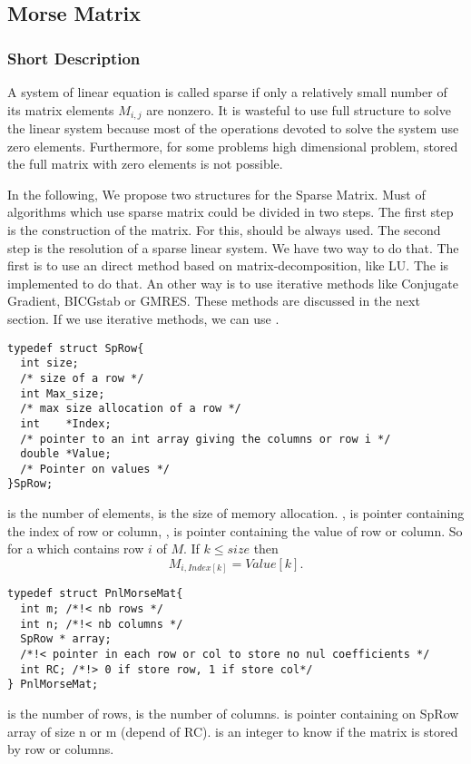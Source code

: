 \subsection{Morse Matrix}
\subsubsection{Short Description}

A system of linear equation is called sparse if only a relatively small number
of its matrix elements $M_{i, j}$ are nonzero. It is wasteful to use full
structure to solve the linear system because most of the operations
devoted to solve the system use zero elements. Furthermore, for some problems
high dimensional problem, stored the full matrix with zero elements is not
possible.


In the following, We propose two structures for the Sparse Matrix.
Must of algorithms which use sparse matrix could be divided in two steps.
The first step is the construction of the matrix. For this, 
 should be always used. The second step is the
resolution of a sparse linear system. We have two way to do that. The first is
to use an direct method based on matrix-decomposition, like LU. The
 is implemented to do that. An other way is to use
iterative methods like Conjugate Gradient, BICGstab or GMRES. These methods are
discussed in the next section. If we use iterative methods, we can use 
. 

\begin{verbatim}
typedef struct SpRow{
  int size;
  /* size of a row */
  int Max_size;
  /* max size allocation of a row */
  int    *Index;
  /* pointer to an int array giving the columns or row i */
  double *Value;
  /* Pointer on values */
}SpRow;
\end{verbatim}
 is the number of elements, 
 is the size of memory allocation.
, is pointer containing the index of row or column, 
, is pointer containing the value of row or column.
So for a  which contains row $i$ of $M$.
If $k \leq size $ then
$$M_{i, Index[k]}=Value[k].$$  

\begin{verbatim}
typedef struct PnlMorseMat{
  int m; /*!< nb rows */ 
  int n; /*!< nb columns */ 
  SpRow * array; 
  /*!< pointer in each row or col to store no nul coefficients */
  int RC; /*!> 0 if store row, 1 if store col*/ 
} PnlMorseMat;
\end{verbatim}
 is the number of rows,  is the number of columns.
 is pointer containing on SpRow array of size n or m (depend of
RC).
 is an integer to know if the matrix is stored by row or columns.

